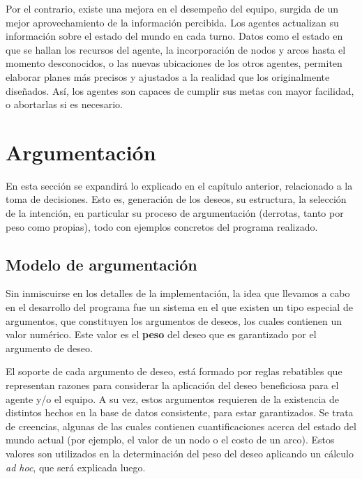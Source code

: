 \documentclass[oneside]{book}
\theoremstyle{definition}
\begin{document}
Por el contrario, existe una mejora en el desempeño del equipo, surgida de un mejor 
aprovechamiento de la información percibida. Los agentes actualizan su información sobre 
el estado del mundo en cada turno. Datos como el estado en que se hallan los recursos del 
agente, la incorporación de nodos y arcos hasta el momento desconocidos, o las nuevas 
ubicaciones de los otros agentes, permiten elaborar planes más precisos y ajustados a la 
realidad que los originalmente diseñados. Así, los agentes son capaces de cumplir sus 
metas con mayor facilidad, o abortarlas si es necesario.



\chapter{Argumentación}

En esta sección se expandirá lo explicado en el capítulo anterior, relacionado a 
la toma de decisiones. Esto es, generación de los deseos, su estructura, la selección de la
intención, en particular su proceso de argumentación (derrotas, tanto por peso como 
propias), todo con ejemplos concretos del programa realizado. 

\section{Modelo de argumentación} 

\label{sec:modeloDeArgumentacion}

Sin inmiscuirse en los detalles de la implementación, la idea que llevamos a cabo en el 
desarrollo del programa fue un sistema en el que existen un tipo especial de argumentos,
que constituyen los argumentos de deseos, los cuales contienen un valor numérico.
Este valor es el \textbf{peso} del deseo que es garantizado por el argumento de deseo. 

El soporte de cada argumento de deseo, está formado por reglas rebatibles que representan
razones para considerar la aplicación del deseo beneficiosa para el agente y/o el equipo.
A su vez, estos argumentos requieren de la existencia de distintos hechos en la base de 
datos consistente, para estar garantizados. Se trata de creencias, algunas de las cuales
contienen cuantificaciones acerca del estado del mundo actual (por 
ejemplo, el valor de un nodo o el costo de un arco). Estos valores son utilizados en la
determinación del peso del deseo aplicando un cálculo \textit{ad hoc}, %
que será explicada luego.
\end{document}
